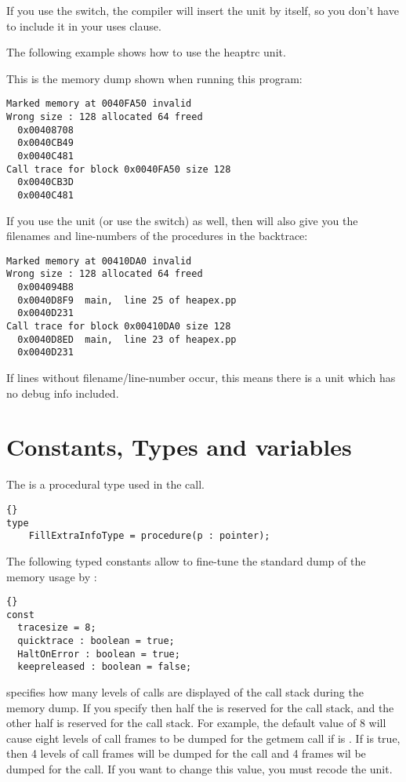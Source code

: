 If you use the  switch, the compiler will insert the unit by itself,
so you don't have to include it in your uses clause.

The following example shows how to use the heaptrc unit.
\latex{}
\html{}

This is the memory dump shown when running this program:
\begin{verbatim}
Marked memory at 0040FA50 invalid
Wrong size : 128 allocated 64 freed
  0x00408708
  0x0040CB49
  0x0040C481
Call trace for block 0x0040FA50 size 128
  0x0040CB3D
  0x0040C481
\end{verbatim}

If you use the  unit (or use the  switch) as well,
then  will also give you the filenames and line-numbers of
the procedures in the backtrace:
\begin{verbatim}
Marked memory at 00410DA0 invalid
Wrong size : 128 allocated 64 freed
  0x004094B8
  0x0040D8F9  main,  line 25 of heapex.pp
  0x0040D231
Call trace for block 0x00410DA0 size 128
  0x0040D8ED  main,  line 23 of heapex.pp
  0x0040D231
\end{verbatim}
If lines without filename/line-number occur, this means there is a unit which
has no debug info included.

\section{Constants, Types and variables}

The  is a procedural type used in the
 call.

\begin{lstlisting}{}
type
    FillExtraInfoType = procedure(p : pointer);
\end{lstlisting}{}
The following typed constants allow to fine-tune the standard dump of the
memory usage by :

\begin{lstlisting}{}
const
  tracesize = 8;
  quicktrace : boolean = true;
  HaltOnError : boolean = true;
  keepreleased : boolean = false;
\end{lstlisting}{}

 specifies how many levels of calls are displayed of the 
call stack during the memory dump. If you specify 
then half the  is reserved for the  call stack, 
and the other half is reserved for the  call stack.
For example, the default value of 8 will cause eight levels of call frames
to be dumped for the getmem call if  is . If
 is true, then 4 levels of call frames will be dumped for
the  call and 4 frames wil be dumped for the  call.
If you want to change this value, you must recode the  unit.

